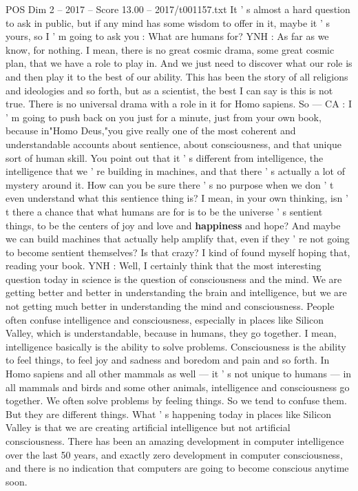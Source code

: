 \begin{textsample}{POS Dim 2 – 2017 – Score 13.00 – 2017/t001157.txt}
It ' s almost a hard question to ask in public, but if any mind has some wisdom to offer in it, maybe it ' s yours, so I ' m going to ask you : What are humans for?
YNH : As far as we know, for nothing.
I mean, there is no great cosmic drama, some great cosmic plan, that we have a role to play in.
And we just need to discover what our role is and then play it to the best of our ability.
This has been the story of all religions and ideologies and so forth, but as a scientist, the best I can say is this is not true.
There is no universal drama with a role in it for Homo sapiens.
So — CA : I ' m going to push back on you just for a minute, just from your own book, because in"Homo Deus,"you give really one of the most coherent and understandable accounts about sentience, about consciousness, and that unique sort of human skill.
You point out that it ' s different from intelligence, the intelligence that we ' re building in machines, and that there ' s actually a lot of mystery around it.
How can you be sure there ' s no purpose when we don ' t even understand what this sentience thing is?
I mean, in your own thinking, isn ' t there a chance that what humans are for is to be the universe ' s sentient things, to be the centers of joy and love and \textbf{happiness} and hope?
And maybe we can build machines that actually help amplify that, even if they ' re not going to become sentient themselves?
Is that crazy?
I kind of found myself hoping that, reading your book.
YNH : Well, I certainly think that the most interesting question today in science is the question of consciousness and the mind.
We are getting better and better in understanding the brain and intelligence, but we are not getting much better in understanding the mind and consciousness.
People often confuse intelligence and consciousness, especially in places like Silicon Valley, which is understandable, because in humans, they go together.
I mean, intelligence basically is the ability to solve problems.
Consciousness is the ability to feel things, to feel joy and sadness and boredom and pain and so forth.
In Homo sapiens and all other mammals as well — it ' s not unique to humans — in all mammals and birds and some other animals, intelligence and consciousness go together.
We often solve problems by feeling things.
So we tend to confuse them.
But they are different things.
What ' s happening today in places like Silicon Valley is that we are creating artificial intelligence but not artificial consciousness.
There has been an amazing development in computer intelligence over the last 50 years, and exactly zero development in computer consciousness, and there is no indication that computers are going to become conscious anytime soon.

\end{textsample}
